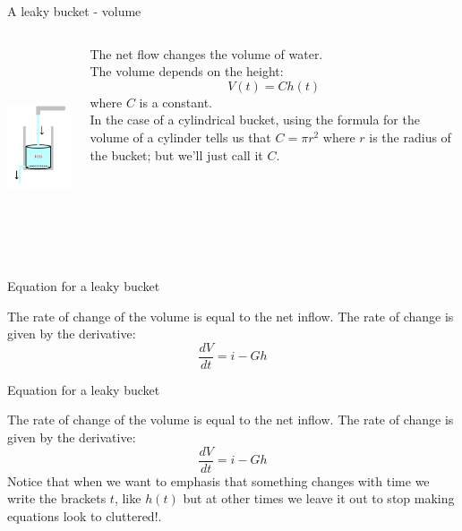 \documentclass{beamer}
\newcommand{\crish}{\color{reddish}}
\newcommand{\cbla}{\color{black}}
\begin{document}
\begin{frame}{A leaky bucket - volume}
\begin{columns}
\begin{column}{0.5\textwidth}
  \begin{center}
     \includegraphics[height=6cm]{glass_volume_notation.png}      
     \end{center}
\end{column}
\begin{column}{0.5\textwidth}
  The net flow changes the volume of water.\\[0.5cm]
  
The volume depends on the height:
  \crish
  $$V(t)=Ch(t)$$ \cbla{}where \crish$C$\cbla{} is a constant.\\[0.5cm]
  In the case of a
  cylindrical bucket, using the formula for the volume of a cylinder
  tells us that \crish$C=\pi r^2$\cbla{} where \crish$r$\cbla{} is the
  radius of the bucket; but we'll just call it \crish$C$\cbla.
\end{column}
\end{columns}
\end{frame}

\begin{frame}{Equation for a leaky bucket}

  The rate of change of the volume is equal to the net inflow. The
  rate of change is given by the derivative:\crish
  $$\frac{dV}{dt}=i-Gh$$
  \cbla{}
\end{frame}


\begin{frame}{Equation for a leaky bucket}

  The rate of change of the volume is equal to the net inflow. The
  rate of change is given by the derivative:\crish
  $$\frac{dV}{dt}=i-Gh$$
  \cbla{}Notice that when we want to emphasis that something changes with time we write the brackets \crish$t$\cbla, like \crish$h(t)$\cbla{} but at other times we leave it out to stop making equations look to cluttered!\cbla.
\end{frame}
\end{document}
